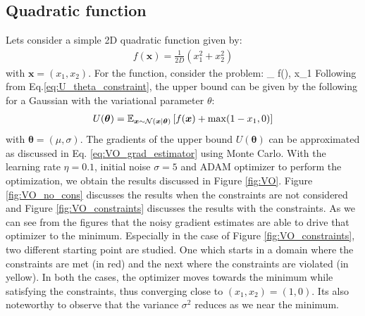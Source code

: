 \subsection{Quadratic function}
Lets consider a simple 2D quadratic function given by:
\begin{align}
	f(\bm{x}) = \frac{1}{2D}\left( x_1^2 + x_2^2\right)
\end{align}
with $\bm{x} = (x_1,x_2)$. For the function, consider the problem:
\be
\min_{} f(), \qquad {}  x_1 
\ee
%
Following from Eq.\ref{eq:U_theta_constraint}, the upper bound can be given by the following for a Gaussian with the variational parameter $\theta$:
\begin{align}
	U(\bm{\theta}) = \mathbb{E}_{\bm{x}\sim \mathcal{N}(\bm{x}\mid \bm{\theta})}\left[ f(\bm{x}) + \max (1-x_1,0)\right]
\end{align}
with $\bm{\theta} = (\mu,\sigma)$. The gradients of the upper bound $U(\bm{\theta})$ can be approximated as discussed in Eq. \ref{eq:VO_grad_estimator} using Monte Carlo. With the learning rate $\eta=0.1$, initial noise $\sigma = 5$ and ADAM optimizer to perform the optimization, we obtain the results discussed in Figure \ref{fig:VO}. Figure \ref{fig:VO_no_cons} discusses the results when the constraints are not considered and Figure \ref{fig:VO_constraints} discusses the results with the constraints. As we can see from the figures that the noisy gradient estimates are able to drive that optimizer to the minimum. Especially in the case of Figure \ref{fig:VO_constraints}, two different starting point are studied. One which starts in a domain where the constraints are met (in red) and the next where the constraints are violated (in yellow). In both the cases, the optimizer moves towards the minimum while satisfying the constraints, thus converging close to $(x_1,x_2)= (1,0)$. Its also noteworthy to observe that the variance $\sigma^2$ reduces as we near the minimum.  

